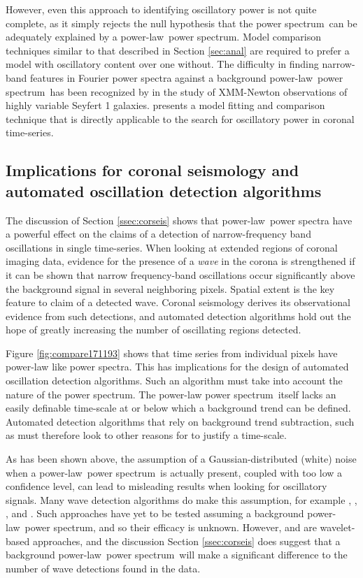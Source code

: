 \documentclass[onecolumn]{emulateapj}
\newcommand{\PS}{power spectrum}
\newcommand{\PL}{power-law}
\begin{document}
However, even this approach to identifying oscillatory power is not
quite complete, as it simply rejects the null hypothesis that the
\PS\ can be adequately explained by a \PL\ \PS.  Model comparison
techniques similar to that described in Section \ref{sec:anal} are
required to prefer a model with oscillatory content over one
without. The difficulty in finding narrow-band features in Fourier
power spectra against a background \PL\ \PS\ has been recognized by
\cite{2010MNRAS.402..307V} in the study of XMM-Newton observations of
highly variable Seyfert 1 galaxies.  \cite{2010MNRAS.402..307V}
presents a model fitting and comparison technique that is directly
applicable to the search for oscillatory power in coronal time-series.

\subsection{Implications for coronal seismology and automated
  oscillation detection algorithms}\label{sec:oscdetect}

The discussion of Section \ref{ssec:corseis} shows that \PL\ power
spectra have a powerful effect on the claims of a detection of
narrow-frequency band oscillations in single time-series.  When
looking at extended regions of coronal imaging data, evidence for the
presence of a {\it wave} in the corona is strengthened if it can be
shown that narrow frequency-band oscillations occur significantly
above the background signal in several neighboring pixels.  Spatial
extent is the key feature to claim of a detected wave.  Coronal
seismology derives its observational evidence from such detections,
and automated detection algorithms hold out the hope of greatly
increasing the number of oscillating regions detected.

Figure \ref{fig:compare171193} shows that time series from individual
pixels have power-law like power spectra.  This has implications for
the design of automated oscillation detection algorithms.  Such an
algorithm must take into account the nature of the \PS.  The power-law
\PS\ itself lacks an easily definable time-scale at or below which a
background trend can be defined.  Automated detection algorithms that
rely on background trend subtraction, such as
\cite{2010SoPh..264..403I} must therefore look to other reasons for to
justify a time-scale.

As has been shown above, the assumption of a Gaussian-distributed
(white) noise when a \PL\ \PS\ is actually present, coupled with too
low a confidence level, can lead to misleading results when looking
for oscillatory signals.  Many wave detection algorithms do make this
assumption, for example \cite{2004SoPh..223....1D},
\cite{2007SoPh..241..397N}, \cite{2008SoPh..248..395S},
\cite{2010SoPh..264..403I} and \cite{2013SoPh..286..405C}.  Such
approaches have yet to be tested assuming a background \PL\ \PS, and
so their efficacy is unknown.  However, \cite{2004SoPh..223....1D} and
\cite{2008SoPh..248..395S} are wavelet-based approaches, and the
discussion Section \ref{ssec:corseis} does suggest that a background
\PL\ \PS\ will make a significant difference to the number of wave
detections found in the data.
\end{document}
